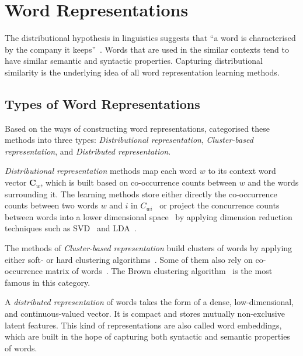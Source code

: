 \section{Word Representations}
\label{wordrep}
The distributional hypothesis in linguistics suggests that ``a word is characterised by the company it keeps''~\cite{firth1957}. Words that are used in the similar contexts tend to have similar semantic and syntactic properties. Capturing distributional similarity is the underlying idea of all word representation learning methods. 

\subsection{Types of Word Representations}
Based on the ways of constructing word representations,  categorised these methods into three types: \textit{Distributional representation},  \textit{Cluster-based representation}, and \textit{Distributed representation}.

\textit{Distributional representation} methods map each word $w$ to its context word vector $\mathbf{C}_w$, which is built based on co-occurrence counts between $w$ and the words surrounding it. The learning methods store either directly the co-occurrence counts between two words $w$ and $i$ in $C_{wi}$~\cite{sahlgren2006word,turney2010frequency,honkela1997self} or project the concurrence counts between words into a lower dimensional space~\cite{vrehuuvrek2010software,lund1996producing} by applying dimension reduction techniques such as SVD~\cite{dumais1988using} and LDA~\cite{blei2003latent}. 

The methods of \textit{Cluster-based representation} build clusters of words by applying either soft- or hard clustering algorithms~\cite{lin2009phrase,li2005semi}. Some of them also rely on co-occurrence matrix of words~\cite{pereira1993distributional}. The Brown clustering algorithm~\cite{Brown92class-basedn-gram} is the most famous in this category.

A \textit{distributed representation} of words takes the form of a dense, low-dimensional, and continuous-valued vector. It is compact and stores mutually non-exclusive latent features. This kind of representations are also called word embeddings, which are built in the hope of capturing both syntactic and semantic properties of words.

